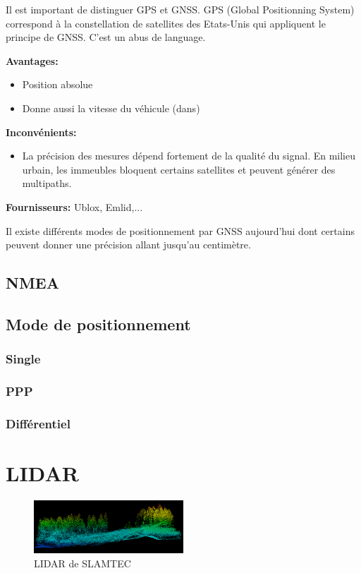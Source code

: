 \documentclass[a4paper, 11pt]{report}
\begin{document}
Il est important de distinguer GPS et GNSS. GPS (Global Positionning System) correspond à la constellation de satellites des Etats-Unis qui appliquent le principe de GNSS. C'est un abus de language.

\textbf{Avantages:}
\begin{itemize}
\item Position absolue
\item Donne aussi la vitesse du véhicule (dans)
\end{itemize}

\textbf{Inconvénients:}
\begin{itemize}
\item La précision des mesures dépend fortement de la qualité du signal. En milieu urbain, les immeubles bloquent certains satellites et peuvent générer des multipaths.
\end{itemize}

\textbf{Fournisseurs:} Ublox, Emlid,...

Il existe différents modes de positionnement par GNSS aujourd'hui dont certains peuvent donner une  précision allant jusqu'au centimètre.

\subsection{NMEA}

\subsection{Mode de positionnement}

\subsubsection{Single}

\subsubsection{PPP}

\subsubsection{Différentiel}


\section{LIDAR}

\begin{figure}[h]
\begin{centering}
\includegraphics[width=0.5\textwidth]{images/NuageDePoints.png}
\caption{LIDAR de SLAMTEC}
\par\end{centering}
\end{figure}
\end{document}
